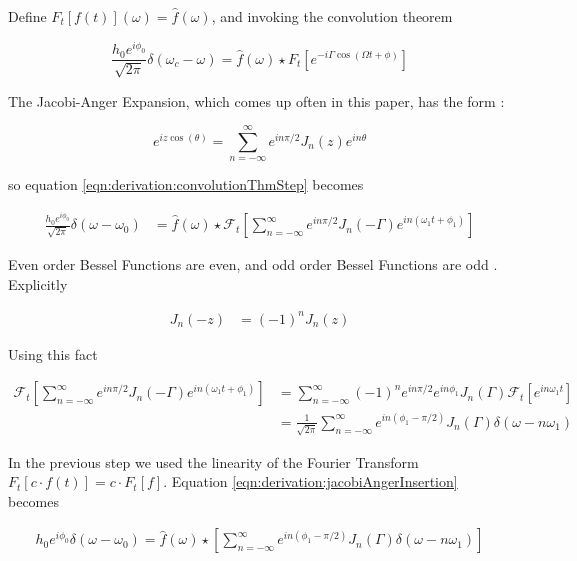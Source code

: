\documentclass[onecolumn, groupedaddress, 10pt]{revtex4-1}
\begin{document}
Define $F_t[f(t)](\omega) = \hat{f}(\omega)$, and invoking the convolution theorem

\begin{equation}
\label{eqn:derivation:convolutionThmStep}
\frac{h_0 e^{i\phi_0}}{\sqrt{2\pi}} \delta (\omega_c - \omega) = \hat{f}(\omega) \star F_t \left[ e^{-i\Gamma \cos (\Omega t + \phi)} \right]
\end{equation}

The Jacobi-Anger Expansion, which comes up often in this paper, has the form \cite{}:

\begin{equation}
\label{eqn:jacobiAnger}
e^{iz\cos (\theta)} = \sum_{n=-\infty}^{\infty} e^{in\pi/2} J_n(z) e^{in\theta}
\end{equation}

so equation \ref{eqn:derivation:convolutionThmStep} becomes

\begin{align}
\label{eqn:derivation:jacobiAngerInsertion}
\frac{h_0 e^{i\phi_0}}{\sqrt{2\pi}} \delta (\omega - \omega_0)
&=
\hat{f}(\omega)
\star \mathcal{F}_t \left[ \sum_{n=-\infty}^{\infty} e^{in\pi/2} J_n(-\Gamma) e^{in(\omega_1 t + \phi_1)} \right]
\end{align}

Even order Bessel Functions are even, and odd order Bessel Functions are odd \cite{}.  Explicitly

\begin{align}
	J_n(-z) &= (-1)^n J_n(z)
\end{align}

Using this fact

\begin{align}
\mathcal{F}_t \left[ \sum_{n=-\infty}^{\infty} e^{in\pi/2} J_n(-\Gamma) e^{in(\omega_1 t + \phi_1)} \right]
&= \sum_{n=-\infty}^{\infty} (-1)^n e^{in\pi/2} e^{in\phi_1} J_n(\Gamma) \mathcal{F}_t \left[e^{in\omega_1 t} \right]	 \\
&= \frac{1}{\sqrt{2\pi}}\sum_{n=-\infty}^{\infty} e^{in(\phi_1 - \pi/2)} J_n(\Gamma) \delta (\omega - n\omega_1)
\end{align}

In the previous step we used the linearity of the Fourier Transform $F_t[c \cdot f(t)] = c \cdot F_t[f]$.  Equation \ref{eqn:derivation:jacobiAngerInsertion} becomes

\begin{align}
h_0 e^{i\phi_0} \delta (\omega - \omega_0) = \hat{f}(\omega)
\star
\left[ \sum_{n=-\infty}^{\infty} e^{in(\phi_1 - \pi/2)} J_n(\Gamma) \delta (\omega - n\omega_1) \right]
\end{align}
\end{document}
